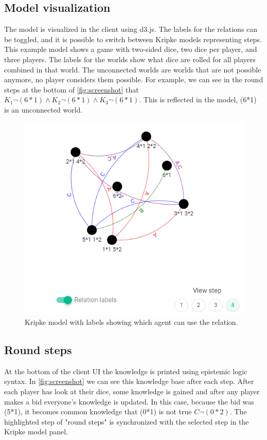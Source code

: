 \documentclass{article}
\begin{document}
\subsection*{Model visualization} %
The model is visualized in the client using d3.js. The labels for the relations can be toggled, and it is possible to switch between Kripke models representing steps. This example model shows a game with two-sided dice, two dice per player, and three players. The labels for the worlds show what dice are rolled for all players combined in that world. The unconnected worlds are worlds that are not possible anymore, no player considers them possible. For example, we can see in the round steps at the bottom of \autoref{fig:screenshot} that $K_1 \neg (6*1) \land K_2 \neg (6*1) \land K_3 \neg (6*1)$. This is reflected in the model, (6*1) is an unconnected world.

\begin{figure}[h]
    \includegraphics[width=.5\textwidth]{img/withrelations.png}
    \centering
    \caption{Kripke model with labels showing which agent can use the relation.}
    \label{fig:screenshot}
\end{figure}

\subsection*{Round steps}
At the bottom of the client UI the knowledge is printed using epistemic logic syntax. In \autoref{fig:screenshot} we can see this knowledge base after each step. After each player has look at their dice, some knowledge is gained and after any player makes a bid everyone's knowledge is updated. In this case, because the bid was (5*1), it becomes common knowledge that (0*1) is not true $C \neg(0*2)$. The highlighted step of "round steps" is synchronized with the selected step in the Kripke model panel.
\end{document}
